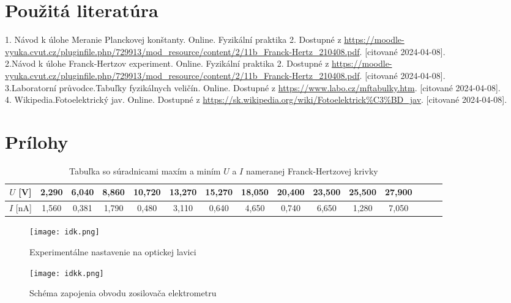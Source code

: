 \documentclass{article}
\begin{document}
\section{Použitá literatúra}
1. Návod k úlohe Meranie Planckovej konštanty. Online. Fyzikální praktika 2. Dostupné z \url{https://moodle-vyuka.cvut.cz/pluginfile.php/729913/mod_resource/content/2/11b_Franck-Hertz_210408.pdf}. [citované 2024-04-08].\\
2.Návod k úlohe Franck-Hertzov experiment. Online. Fyzikální praktika 2. Dostupné z \url{https://moodle-vyuka.cvut.cz/pluginfile.php/729913/mod_resource/content/2/11b_Franck-Hertz_210408.pdf}. [citované 2024-04-08].\\
3.Laboratorní průvodce.Tabuľky fyzikálnych veličín. Online. Dostupné z \url{https://www.labo.cz/mftabulky.htm}. [citované 2024-04-08]. \\
4.  Wikipedia.Fotoelektrický jav. Online. Dostupné z \url{https://sk.wikipedia.org/wiki/Fotoelektrick%C3%BD_jav}.
[citované 2024-04-08].  \\

\section*{Prílohy}

\begin{table}[h]
\centering
\begin{adjustbox}{width=1.18\textwidth}
\begin{tabular}{|c|c|c|c|c|c|c|c|c|c|c|c|c|c|c }
\hline
$U$ [V] & 2,290  & 6,040 & 8,860 & 10,720 & 13,270 & 15,270 & 18,050 & 20,400 & 23,500 &  25,500 & 27,900 \\ \hline
$I$ [nA] & 1,560 & 0,381 & 1,790 & 0,480 & 3,110 & 0,640 & 4,650 & 0,740 & 6,650 & 1,280 & 7,050 \\ \hline
\end{tabular}
\end{adjustbox}
\captionsetup{justification=centering}
\caption{\label{tab:tab1} Tabuľka so súradnicami maxím a miním $U$ a $I$ nameranej Franck-Hertzovej krivky}
\end{table}

\begin{figure}[h]
\centering
\texttt{[image: idk.png]}
\caption{\label{fig:lavica}Experimentálne nastavenie na optickej lavici}
\end{figure}

\begin{figure}
\centering
\texttt{[image: idkk.png]}
\caption{\label{fig:obvod}Schéma zapojenia obvodu zosilovača elektrometru}
\end{figure}
\end{document}
